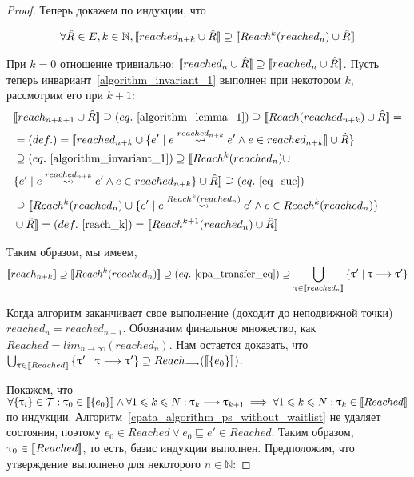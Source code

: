 \begin{proof}
 Теперь докажем по индукции, что 
 
 \begin{equation}
 \label{algorithm_invariant_1}
 \begin{aligned}
 \forall \hat{R} \in E, k \in \mathbb{N}, [\![ reached_{n+k} \cup \hat{R} ]\!] \supseteq [\![ Reach^k(reached_n) \cup \hat{R} ]\!]
 \end{aligned}
 \end{equation}
 
 При $k=0$ отношение тривиально: $[\![ reached_n \cup \hat{R} ]\!] \supseteq [\![ reached_n \cup \hat{R} ]\!]$.
 Пусть теперь инвариант~\ref{algorithm_invariant_1} выполнен при некотором $k$, рассмотрим его при $k+1$:
 \begin{align*}
 & \conc{reach_{n+k+1} \cup \hat{R}} \supseteq (eq.~\ref{algorithm_lemma_1}) \supseteq \conc{Reach(reached_{n+k}) \cup \hat{R}} = \\
 & = (def.) = \conc{reached_{n+k} \cup \{e' \mid e \tat{reached_{n+k}} e' \land e \in reached_{n+k}} \cup \hat{R}\} \\
 & \supseteq (eq.~\ref{algorithm_invariant_1}) \supseteq \conc{Reach^k(reached_n) \cup \\
 & \{e' \mid e \tat{reached_{n+k}} e' \land e \in reached_{n+k}\} \cup \hat{R}} \supseteq (eq.~\ref{eq_suc}) \\
 & \supseteq \conc{Reach^k(reached_n) \cup \{e' \mid e \tat{Reach^k(reached_n)} e' \land e \in Reach^k(reached_n)\} \\ 
 & \cup \hat{R}} = (def.~\ref{reach_k}) = \conc{Reach^{k+1}(reached_n) \cup \hat{R}}
 \end{align*}

Таким образом, мы имеем,
\begin{equation}
 \label{algorithm_invariant_2}
 \begin{aligned}
 \conc{reach_{n+k}} \supseteq \conc{Reach^k(reached_n)} \supseteq (eq.~\ref{cpa_transfer_eq}) \supseteq \bigcup_{\tau \in \conc{reached_n}}{\{\tau' \mid \tau \tcarrow \tau'\}}
 \end{aligned}
 \end{equation}


Когда алгоритм заканчивает свое выполнение (доходит до неподвижной точки) $reached_n = reached_{n+1}$. 
Обозначим финальное множество, как $Reached = lim_{n \rightarrow \infty}(reached_n)$.
Нам остается доказать, что $\bigcup_{\uptau \in [\![ Reached ]\!]}{\{\uptau' \mid \uptau \longrightarrow \uptau'\}} \supseteq Reach_{\longrightarrow}([\![ \{e_0\} ]\!])$.


Покажем, что $\forall \{\uptau_i\} \in \mathcal{T}: \uptau_0 \in [\![ \{e_0\} ]\!] \land \forall 1 \leqslant k \leqslant N: \uptau_{k} \longrightarrow \uptau_{k+1} \implies \forall 1 \leqslant k \leqslant N: \uptau_k \in [\![ Reached ]\!]$ по индукции.
Алгоритм~\ref{cpata_algorithm_ps_without_waitlist} не удаляет состояния, поэтому $e_0 \in Reached \lor e_0 \sqsubseteq e' \in Reached$.
Таким образом, $ \uptau_0 \in [\![ Reached ]\!]$, то есть, базис индукции выполнен.
Предположим, что утверждение выполнено для некоторого $n \in \mathbb{N}$:


\end{proof}
